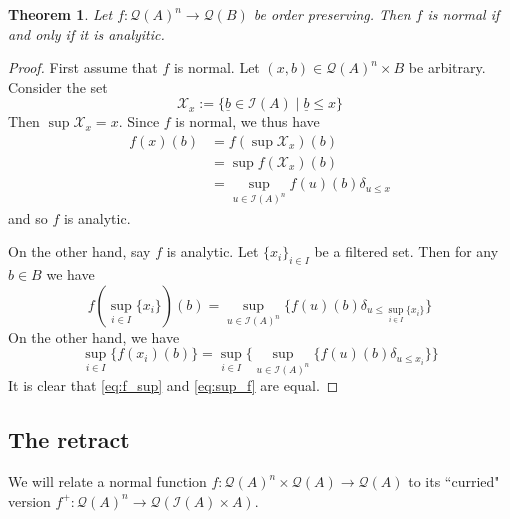 \documentclass[12pt]{article}
\theoremstyle{plain}
\newtheorem{thm}{Theorem}[subsection] %
\theoremstyle{definition}
\newcommand{\scr}[1]{\mathscr{#1}}
\newcommand{\call}[1]{\mathcal{#1}}
\newcommand{\Ical}{\call{I}}
\newcommand{\Qcal}{\call{Q}}
\newcommand{\lto}{\longrightarrow}
\begin{document}
\begin{thm}\label{thm:normal_analytic}
	Let $f: \Qcal(A)^n \lto \Qcal(B)$ be order preserving. Then $f$ is normal if and only if it is analyitic.
	\end{thm}
\begin{proof}
	First assume that $f$ is normal. Let $(x,b) \in \Qcal(A)^n \times B$ be arbitrary. Consider the set
	\begin{equation}
		\scr{X}_x := \{ \underline{b} \in \Ical(A) \mid \underline{b} \leq x \}
		\end{equation}
	Then $\operatorname{sup} \scr{X}_x = x$. Since $f$ is normal, we thus have
	\begin{align*}
		f(x)(b) &= f(\operatorname{sup}\scr{X}_x)(b)\\
		&= \operatorname{sup}f(\scr{X}_x)(b)\\
		&= \operatorname{sup}_{u \in \Ical(A)^n}f(u)(b)\delta_{u \leq x}
		\end{align*}
	and so $f$ is analytic.
	
	On the other hand, say $f$ is analytic. Let $\{ x_i \}_{i \in I}$ be a filtered set. Then for any $b \in B$ we have
	\begin{equation}\label{eq:f_sup}
		f(\operatorname{sup}_{i \in I}\{ x_i \})(b) = \operatorname{sup}_{u \in \Ical(A)^n}\big\{f(u)(b)\delta_{u \leq \operatorname{sup}_{i \in I}\{ x_i \}}\big\}
		\end{equation}
	On the other hand, we have
	\begin{equation}\label{eq:sup_f}
		\operatorname{sup}_{i \in I}\{ f(x_i)(b) \} = \operatorname{sup}_{i \in I}\big\{ \operatorname{sup}_{u \in \Ical(A)^n}\{ f(u)(b)\delta_{u \leq x_i}\} \big\}
		\end{equation}
	It is clear that \eqref{eq:f_sup} and \eqref{eq:sup_f} are equal.
	\end{proof}
	
	\subsection{The retract}
	We will relate a normal function $f: \Qcal(A)^{n} \times \Qcal(A) \lto \Qcal(A)$ to its ``curried" version $f^+: \Qcal(A)^n \lto \Qcal(\Ical(A) \times A)$.
	
\end{document}
